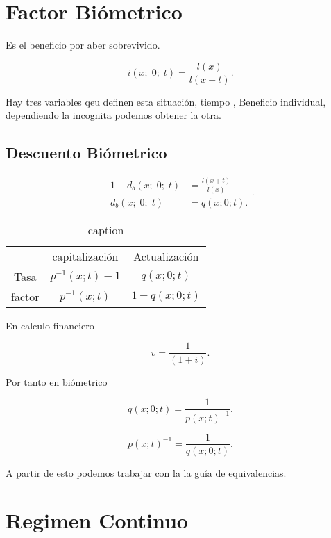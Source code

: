 
\section{Factor Biómetrico}
 
Es el beneficio por aber sobrevivido.

\[
    i (x;\; 0;\; t) =  \frac{l(x)}{l(x+t)}

.\] 


Hay tres variables qeu definen esta situación, {\color{blue} tiempo} ,  {\color{red}  
Beneficio individual}, dependiendo la incognita podemos obtener la otra.

\subsection{Descuento Biómetrico } 

\[
    \begin{align*}
        1- d_b(x;\; 0;\; t) &= \frac{l(x+t)}{l(x)} \\
        d_b(x;\; 0;\; t) &= q(x;0;t)
    .\end{align*}
.\] 



\begin{table}[htpb]
    \centering
    \caption{caption}
    \label{tab:label}
    \begin{tabular}{ccc}
 🤯   & capitalización  &  Actualización \\[0.2cm] 
   Tasa & $p^{-1}(x;t)-1$  &  $q(x;0;t)$ \\[0.2cm] 
   factor & $p^{-1}(x;t)$  &  $1-q(x;0;t)$ 
    \end{tabular}
\end{table}


En calculo financiero

\[
    v = \frac{1}{(1+i)}
.\] 

Por tanto en biómetrico

\[
q(x;0;t) = \frac{1}{p(x;t)^{-1}}
.\] 


\[
p(x;t)^{-1} = \frac{1}{q(x;0;t)}
.\] 

A partir de esto podemos trabajar con la la guía de equivalencias.


\section{Regimen Continuo}



